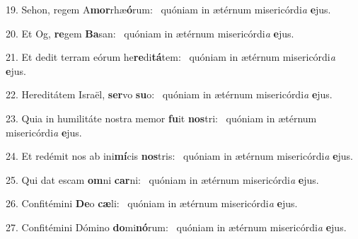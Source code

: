 19. Sehon, regem A\textbf{mor}rhæ\textbf{ó}rum: \ast\  quóniam in ætérnum misericórdi\textit{a} \textbf{e}jus.\

20. Et Og, \textbf{re}gem \textbf{Ba}san: \ast\  quóniam in ætérnum misericórdi\textit{a} \textbf{e}jus.\

21. Et dedit terram eórum he\textbf{re}di\textbf{tá}tem: \ast\  quóniam in ætérnum misericórdi\textit{a} \textbf{e}jus.\

22. Hereditátem Israël, \textbf{ser}vo \textbf{su}o: \ast\  quóniam in ætérnum misericórdi\textit{a} \textbf{e}jus.\

23. Quia in humilitáte nostra memor \textbf{fu}it \textbf{nos}tri: \ast\  quóniam in ætérnum misericórdi\textit{a} \textbf{e}jus.\

24. Et redémit nos ab ini\textbf{mí}cis \textbf{nos}tris: \ast\  quóniam in ætérnum misericórdi\textit{a} \textbf{e}jus.\

25. Qui dat escam \textbf{om}ni \textbf{car}ni: \ast\  quóniam in ætérnum misericórdi\textit{a} \textbf{e}jus.\

26. Confitémini \textbf{De}o \textbf{cæ}li: \ast\  quóniam in ætérnum misericórdi\textit{a} \textbf{e}jus.\

27. Confitémini Dómino \textbf{do}mi\textbf{nó}rum: \ast\  quóniam in ætérnum misericórdi\textit{a} \textbf{e}jus.\

